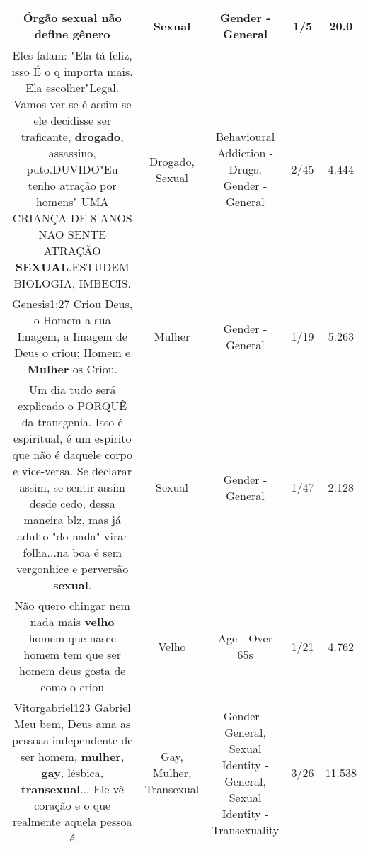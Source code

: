 \documentclass[11pt]{article}
\newlength\mylength
\begin{document}
\begin{center}
\begin{longtable}{|C{.65\mylength}|C{.30\mylength}|C{.12\mylength}|C{.12\mylength}|C{.12\mylength}|}
  \small Órgão \textbf{sexual} não define gênero\normalsize   & Sexual & Gender - General & 1/5 & 20.0 \\  \hline
  \small Eles falam: "Ela tá feliz, isso É o q importa mais. Ela escolher"Legal. Vamos ver se é assim se ele decidisse ser traficante, \textbf{drogado}, assassino, puto.DUVIDO"Eu tenho atração por homens" UMA CRIANÇA DE 8 ANOS NAO SENTE ATRAÇÃO \textbf{SEXUAL}.ESTUDEM BIOLOGIA, IMBECIS.\normalsize   & Drogado, Sexual & Behavioural Addiction - Drugs, Gender - General & 2/45 & 4.444 \\  \hline
  \small Genesis1:27 Criou Deus, o Homem a sua Imagem, a Imagem de Deus o criou; Homem e \textbf{Mulher} os Criou.\normalsize   & Mulher & Gender - General & 1/19 & 5.263 \\  \hline
  \small Um dia tudo será explicado o PORQUÊ da transgenia. Isso é espiritual, é um espirito que não é daquele corpo e vice-versa. Se declarar assim, se sentir assim desde cedo, dessa maneira blz, mas já adulto "do nada" virar folha...na boa é sem vergonhice e perversão \textbf{sexual}.\normalsize   & Sexual & Gender - General & 1/47 & 2.128 \\  \hline
  \small Não quero chingar nem nada mais \textbf{velho} homem que nasce homem tem que ser homem deus gosta de como o criou\normalsize   & Velho & Age - Over 65s & 1/21 & 4.762 \\  \hline
  \small Vitorgabriel123 Gabriel Meu bem, Deus ama as pessoas independente de ser homem, \textbf{mulher}, \textbf{gay}, lésbica, \textbf{transexual}...  Ele vê coração e o que realmente aquela pessoa é\normalsize   & Gay, Mulher, Transexual & Gender - General, Sexual Identity - General, Sexual Identity - Transexuality & 3/26 & 11.538 \\  \hline

\end{longtable}
\end{center}
\end{document}
